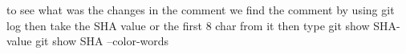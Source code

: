 to see what was the changes in the comment 
we find the comment by using git log 
then take the SHA value or the first 8 char from it 
then type 
git show SHA-value 
git show SHA --color-words 